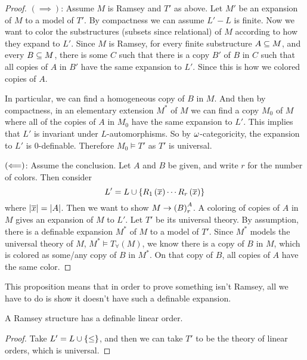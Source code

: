 \documentclass{amsart}
\begin{document}
\begin{proof}
$\left( \implies \right)$: Assume $M$ is Ramsey and $T'$ as above. Let $M'$ be an
expansion of $M$ to a model of $T'$. 
By compactness we can assume $L'\minus L$ is finite. 
Now we want to color the substructures (subsets since relational) of $M$ according to how
they expand to $L'$. Since $M$ is Ramsey, for every finite substructure $A\subseteq M$, and every 
$B\subseteq M$, there is some $C$ such that there is a copy $B'$ of $B$ in
$C$ such that all copies of $A$ in $B'$ have the same expansion to $L'$.
Since this is how we colored copies of $A$.

In particular, we can find a homogeneous copy of $B$ in $M$. And then by compactness, in
an elementary extension $M^*$ of $M$
we can find a copy $M_0$ of $M$ where all of the copies of $A$ in $M_0$ have the same
expansion to $L'$. This implies that $L'$ is invariant under $L$-automorphisms. 
So by $\omega$-categoricity, the expansion to $L'$ is $0$-definable. 
Therefore $M_0\models T'$ as $T'$ is universal.

$\left( \Longleftarrow \right)$: Assume the conclusion. 
Let $A$ and $B$ be given, and write $r$ for the number of colors. Then consider
\begin{equation}
L' = L\cup \left\{ R_1\left( \overline{x} \right) \cdots R_r\left( \overline{x} \right) \right\}
\end{equation}
where $\left| \overline{x} \right| = \left| A \right|$. Then we want to show $M\rightarrow \left( B \right)_r^A$.
A coloring of copies of $A$ in $M$ gives an expansion of $M$ to $L'$.
Let $T'$ be its universal theory. By assumption, there is a definable expansion $M^*$ of
$M$ to a model of $T'$. Since $M^*$ models the universal theory of $M$,
$M^*\models T_{\forall}\left( M \right)$, we know
there is a copy of $B$ in $M$, which is colored as some/any copy
of $B$ in $M^*$. On that copy of $B$, all copies of $A$ have the same color.
\end{proof}

This proposition means that in order to prove something isn't Ramsey, all we have to do is
show it doesn't have such a definable expansion.

\begin{cor}
A Ramsey structure has a definable linear order.
\end{cor}

\begin{proof}
Take $L' = L\cup \left\{ \leq \right\}$, and then we can take $T'$ to be the theory of linear orders,
which is universal.
\end{proof}
\end{document}

